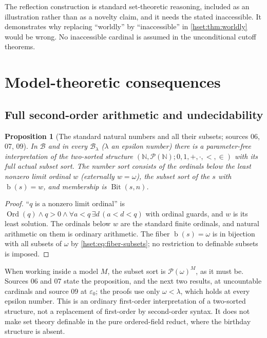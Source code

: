 \documentclass[11pt,letterpaper]{article}
\newtheorem{proposition}[proposition]{Proposition}\aliascntresetthe{proposition}
\theoremstyle{definition}
\theoremstyle{remark}
\newcommand{\Ord}{\operatorname{Ord}}
\newcommand{\bd}{\operatorname{b}}
\newcommand{\B}{\mathcal B}
\newcommand{\Bit}{\operatorname{Bit}}
\newcommand{\Pow}{\mathcal P}
\begin{document}
The reflection construction is standard set-theoretic reasoning, included
as an illustration rather than as a novelty claim, and it needs the stated
inaccessible. It demonstrates why replacing ``worldly'' by ``inaccessible'' in
\cref{hset:thm:worldly} would be wrong. No inaccessible cardinal is assumed in
the unconditional cutoff theorems.

\section{Model-theoretic consequences}
\label{hset:sec:modeltheory}

\subsection{Full second-order arithmetic and undecidability}

\begin{proposition}[The standard natural numbers and all their subsets; sources 06, 07, 09]
\label{hset:prop:arithmetic}
In $\B$ and in every $\B_\lambda$ ($\lambda$ an epsilon number) there is a
parameter-free interpretation of the two-sorted structure
$(\mathbb N,\Pow(\mathbb N);0,1,+,\cdot,<,\in)$ with its \emph{full} actual
subset sort. The number sort consists of the ordinals below the least nonzero
limit ordinal $w$ (externally $w=\omega$), the subset sort of the $s$ with
$\bd(s)=w$, and membership is $\Bit(s,n)$.
\end{proposition}
\begin{proof}
``$q$ is a nonzero limit ordinal'' is
$\Ord(q)\land q>0\land\forall a<q\,\exists d\,(a<d<q)$ with ordinal guards, and
$w$ is its least solution. The ordinals below $w$ are the standard finite
ordinals, and natural arithmetic on them is ordinary arithmetic. The fiber
$\bd(s)=\omega$ is in bijection with all subsets of $\omega$ by
\eqref{hset:eq:fiber-subsets}; no restriction to definable subsets is imposed.
\end{proof}

When working inside a model $M$, the subset sort is $\Pow(\omega)^M$, as it
must be. Sources 06 and 07 state the proposition, and the next two results, at
uncountable cardinals and source 09 at $\varepsilon_0$; the proofs use only
$\omega<\lambda$, which holds at every epsilon number. This is an ordinary
first-order interpretation of a two-sorted
structure, not a replacement of first-order by second-order syntax. It does not
make set theory definable in the pure ordered-field reduct, where the birthday
structure is absent.
\end{document}
